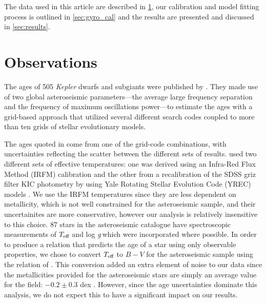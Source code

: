 \documentclass[11pt,preprint]{aastex}
\newcommand{\logg}{log \emph{g}}
\newcommand{\teff}{$T_{\rm{eff}}$}
\begin{document}
The data used in this article are described in \textsection \ref{sec:data}, our calibration and model fitting process is outlined in \textsection \ref{sec:gyro_cal} and the results are presented and discussed in \textsection \ref{sec:results}.

\section{Observations}
\label{sec:data}

The ages of 505 {\it Kepler} dwarfs and subgiants were published by \citet{Chaplin2014}.
They made use of two global asteroseismic parameters---the average large frequency separation and the frequency of maximum oscillations power---to estimate the ages with a grid-based approach that utilized several different search codes coupled to more than ten grids of stellar evolutionary models.

The ages quoted in \citet{Chaplin2014} come from one of the grid-code combinations, with uncertainties reflecting the scatter between the different sets of results.
\citet{Chaplin2014} used two different sets of effective temperatures: one was derived using an Infra-Red Flux Method (IRFM) calibration \citep{Casagrande2010, SilvaAguirre2012} and the other from a recalibration of the SDSS griz filter KIC photometry by \citet{Pinsonneault2012} using Yale Rotating Stellar Evolution Code (YREC) models \citep{Demarque2004}.
We use the IRFM temperatures since they are less dependent on metallicity, which is not well constrained for the asteroseismic sample, and their uncertainites are more conservative, however our analysis is relatively insensitive to this choice.
87 stars in the asteroseismic catalogue have spectroscopic measurements of \teff$~$and \logg$~$which were incorporated where possible.
In order to produce a relation that predicts the age of a star using only observable properties, we chose to convert \teff$~$to $B-V$ for the asteroseismic sample using the relation of \citet{Sekiguchi2000}.
This conversion added an extra element of noise to our data since the metallicities provided for the asteroseismic stars are simply an average value for the field: $-0.2\pm0.3$ dex \citep[see e.g.][]{Silva_Aguirre2011}.
However, since the age uncertainties dominate this analysis, we do not expect this to have a significant impact on our results.
\end{document}
